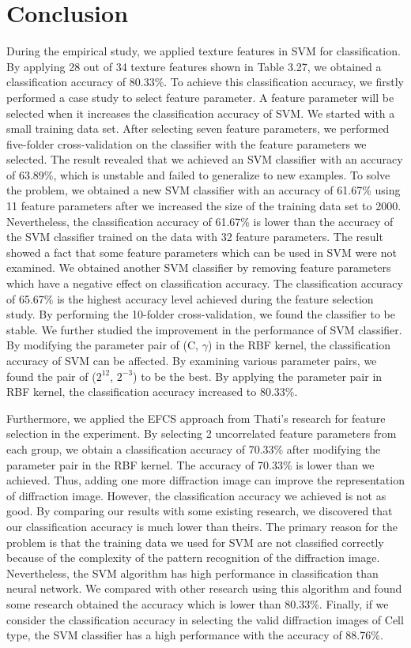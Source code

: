 \section{Conclusion}
During the empirical study, we applied texture features in SVM for classification. By applying 28 out of 34 texture features shown in Table 3.27, we obtained a classification accuracy of 80.33\%. To achieve this classification accuracy, we firstly performed a case study to select feature parameter. A feature parameter will be selected when it increases the classification accuracy of SVM. We started with a small training data set. After selecting seven feature parameters, we performed five-folder cross-validation on the classifier with the feature parameters we selected. The result revealed that we achieved an SVM classifier with an accuracy of 63.89\%, which is unstable and failed to generalize to new examples. To solve the problem, we obtained a new SVM classifier with an accuracy of 61.67\% using 11 feature parameters after we increased the size of the training data set to 2000. Nevertheless, the classification accuracy of 61.67\% is lower than the accuracy of the SVM classifier trained on the data with 32 feature parameters. The result showed a fact that some feature parameters which can be used in SVM were not examined. We obtained another SVM classifier by removing feature parameters which have a negative effect on classification accuracy. The classification accuracy of 65.67\% is the highest accuracy level achieved during the feature selection study. By performing the 10-folder cross-validation, we found the classifier to be stable. We further studied the improvement in the performance of SVM classifier. By modifying the parameter pair of (C, $\gamma$) in the RBF kernel, the classification accuracy of SVM can be affected. By examining various parameter pairs, we found the pair of ($2^{12}$, $2^{-3}$) to be the best. By applying the parameter pair in RBF kernel, the classification accuracy increased to 80.33\%. \par
Furthermore, we applied the EFCS approach from Thati's research for feature selection in the experiment. By selecting 2 uncorrelated feature parameters from each group, we obtain a classification accuracy of 70.33\% after modifying the parameter pair in the RBF kernel. The accuracy of 70.33\% is lower than we achieved. Thus, adding one more diffraction image can improve the representation of diffraction image. However, the classification accuracy we achieved is not as good. By comparing our results with some existing research, we discovered that our classification accuracy is much lower than theirs. The primary reason for the problem is that the training data we used for SVM are not classified correctly because of the complexity of the pattern recognition of the diffraction image. Nevertheless, the SVM algorithm has high performance in classification than neural network. We compared with other research using this algorithm and found some research obtained the accuracy which is lower than 80.33\%\cite{Qayyum}. Finally, if we consider the classification accuracy in selecting the valid diffraction images of Cell type, the SVM classifier has a high performance with the accuracy of 88.76\%.
